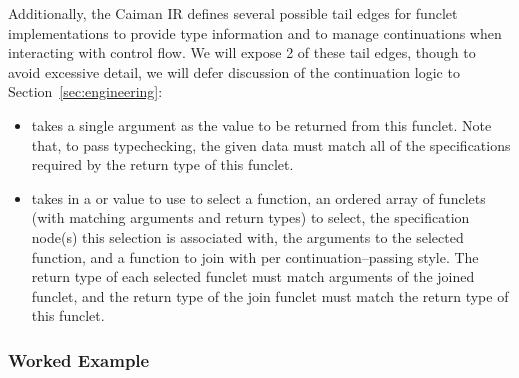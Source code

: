 %
Additionally, the Caiman IR defines several possible tail edges for funclet implementations to provide type information and to manage continuations when interacting with control flow.  We will expose 2 of these tail edges, though to avoid excessive detail, we will defer discussion of the continuation logic to Section~\ref{sec:engineering}:
%
\begin{itemize}
\item {} takes a single argument as the value to be returned from this funclet.  Note that, to pass typechecking, the given data must match all of the specifications required by the return type of this funclet.
\item {} takes in a  or  value to use to select a function, an ordered array of funclets (with matching arguments and return types) to select, the specification node(s) this selection is associated with, the arguments to the selected function, and a function to join with per continuation--passing style.  The return type of each selected funclet must match arguments of the joined funclet, and the return type of the join funclet must match the return type of this funclet.
\end{itemize}
%
\subsubsection{Worked Example}


